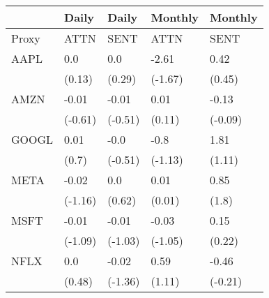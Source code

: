 \begin{tabular}{lllll}
\toprule
{} &    Daily &    Daily &  Monthly &  Monthly \\
\midrule
Proxy &     ATTN &     SENT &     ATTN &     SENT \\
AAPL  &      0.0 &      0.0 &    -2.61 &     0.42 \\
      &   (0.13) &   (0.29) &  (-1.67) &   (0.45) \\
AMZN  &    -0.01 &    -0.01 &     0.01 &    -0.13 \\
      &  (-0.61) &  (-0.51) &   (0.11) &  (-0.09) \\
GOOGL &     0.01 &     -0.0 &     -0.8 &     1.81 \\
      &    (0.7) &  (-0.51) &  (-1.13) &   (1.11) \\
META  &    -0.02 &      0.0 &     0.01 &     0.85 \\
      &  (-1.16) &   (0.62) &   (0.01) &    (1.8) \\
MSFT  &    -0.01 &    -0.01 &    -0.03 &     0.15 \\
      &  (-1.09) &  (-1.03) &  (-1.05) &   (0.22) \\
NFLX  &      0.0 &    -0.02 &     0.59 &    -0.46 \\
      &   (0.48) &  (-1.36) &   (1.11) &  (-0.21) \\
\bottomrule
\end{tabular}
